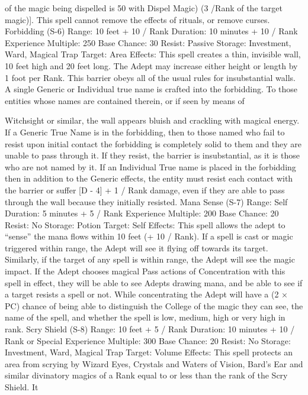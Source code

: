 \documentclass[a4paper]{article}
\begin{document}
\begin{multicols}{3}
of the magic being dispelled is 50%
with Dispel Magic) (3 /Rank of the target magic)].
This spell cannot remove the effects of rituals, or
remove curses.
Forbidding (S-6)
Range: 10 feet + 10 / Rank
Duration: 10 minutes + 10 / Rank
Experience Multiple: 250
Base Chance: 30%
Resist: Passive
Storage: Investment, Ward, Magical Trap
Target: Area
Effects: This spell creates a thin, invisible wall, 10
feet high and 20 feet long. The Adept may increase
either height or length by 1 foot per Rank. This
barrier obeys all of the usual rules for insubstantial
walls. A single Generic or Individual true name is
crafted into the forbidding. To those entities whose
names are contained therein, or if seen by means of

Witchsight or similar, the wall appears bluish and
crackling with magical energy. If a Generic True
Name is in the forbidding, then to those named
who fail to resist upon initial contact the forbidding
is completely solid to them and they are unable to
pass through it. If they resist, the barrier is insubstantial, as it is those who are not named by it. If an
Individual True name is placed in the forbidding
then in addition to the Generic effects, the entity
must resist each contact with the barrier or suffer
[D - 4] + 1 / Rank damage, even if they are able to
pass through the wall because they initially resisted.
Mana Sense (S-7)
Range: Self
Duration: 5 minutes + 5 / Rank
Experience Multiple: 200
Base Chance: 20%
Resist: No
Storage: Potion
Target: Self
Effects: This spell allows the adept to “sense” the
mana flows within 10 feet (+ 10 / Rank). If a spell
is cast or magic triggered within range, the Adept
will see it flying off towards its target. Similarly, if
the target of any spell is within range, the Adept
will see the magic impact. If the Adept chooses
magical Pass actions of Concentration with this
spell in effect, they will be able to see Adepts
drawing mana, and be able to see if a target resists
a spell or not. While concentrating the Adept will
have a (2 × PC) chance of being able to distinguish
the College of the magic they can see, the name of
the spell, and whether the spell is low, medium,
high or very high in rank.
Scry Shield (S-8)
Range: 10 feet + 5 / Rank
Duration: 10 minutes + 10 / Rank or Special
Experience Multiple: 300
Base Chance: 20%
Resist: No
Storage: Investment, Ward, Magical Trap
Target: Volume
Effects: This spell protects an area from scrying by
Wizard Eyes, Crystals and Waters of Vision,
Bard’s Ear and similar divinatory magics of a Rank
equal to or less than the rank of the Scry Shield. It

\end{multicols}
\end{document}
